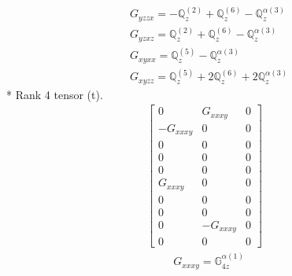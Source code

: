 \documentclass[fleqn,8pt,landscape]{jsarticle}
\begin{document}
\begin{align*}
& G_{yzzx} = - \mathbb{Q}_{z}^{(2)} + \mathbb{Q}_{z}^{(6)} - \mathbb{Q}_{z}^{\alpha(3)} \\
& G_{yzxz} = \mathbb{Q}_{z}^{(2)} + \mathbb{Q}_{z}^{(6)} - \mathbb{Q}_{z}^{\alpha(3)} \\
& G_{xyxx} = \mathbb{Q}_{z}^{(5)} - \mathbb{Q}_{z}^{\alpha(3)} \\
& G_{xyzz} = \mathbb{Q}_{z}^{(5)} + 2 \mathbb{Q}_{z}^{(6)} + 2 \mathbb{Q}_{z}^{\alpha(3)}
\end{align*}
* Rank 4 tensor (t).
\begin{align*}
\begin{bmatrix} 0 & G_{xxxy} & 0 \\ - G_{xxxy} & 0 & 0 \\ 0 & 0 & 0 \\ 0 & 0 & 0 \\ 0 & 0 & 0 \\ G_{xxxy} & 0 & 0 \\ 0 & 0 & 0 \\ 0 & 0 & 0 \\ 0 & - G_{xxxy} & 0 \\ 0 & 0 & 0 \end{bmatrix}
\end{align*}
\begin{align*}
& G_{xxxy} = \mathbb{G}_{4z}^{\alpha(1)}
\end{align*}
\end{document}
